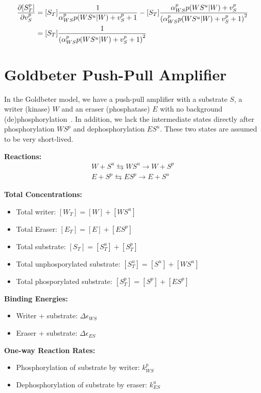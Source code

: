 \documentclass[aps,onecolumn,superscriptaddress,notitlepage]{revtex4-1}
\begin{document}
\begin{align}
\pdv{[S^p_T]}{v_S^p} &=  [S_T]\frac{ 1}{\alpha_{WS}^p p(WS^u|W) + v_S^p+1} - [S_T] \frac{\alpha_{WS}^p p(WS^u|W) + v_S^p}{\qty(\alpha_{WS}^p p(WS^u|W) + v_S^p+1)^2}\\
&= [S_T]\frac{1}{\qty(\alpha_{WS}^p p(WS^u|W) + v_S^p+1)^2}
\end{align}

\section{Goldbeter Push-Pull Amplifier}

In the Goldbeter model, we have a push-pull amplifier with a substrate $S$, a writer (kinase) $W$ and an eraser (phosphatase) $E$ with no background (de)phosphorylation~\cite{Goldbeter1981}. In addition, we lack the intermediate states directly after phosphorylation $WS^p$ and dephosphorylation $ES^u$. These two states are assumed to be very short-lived.

\textbf{Reactions:}
\begin{gather}
W + S^u \leftrightarrows WS^u  \rightarrow W + S^p\\
E + S^p \leftrightarrows ES^p  \rightarrow E + S^u
\end{gather}

\textbf{Total Concentrations:}
\begin{itemize}
\item Total writer: $[W_T] = [W] + [WS^u]$
\item Total Eraser: $[E_T] = [E] + [ES^p]$
\item Total substrate: $[S_T] = [S^u_T] + [S^p_T]$
\item Total unphosporylated substrate: $[S^u_T] = [S^u] + [WS^u]$
\item Total phosporylated substrate: $[S^p_T] = [S^p] + [ES^p]$
\end{itemize}


\textbf{Binding Energies:}
\begin{itemize}
\item Writer + substrate: $\Delta\epsilon_{WS}$
\item Eraser + substrate: $\Delta\epsilon_{ES}$
\end{itemize}

\textbf{One-way Reaction Rates:}
\begin{itemize}
\item Phosphorylation of substrate by writer: $k_{WS}^p$
\item Dephosphorylation of substrate by eraser: $k_{ES}^u$
\end{itemize}
\end{document}
